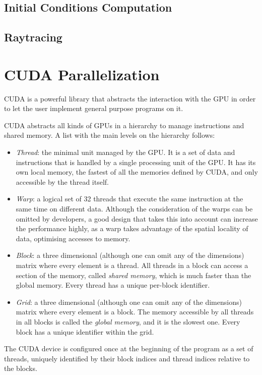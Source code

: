 \subsection{Initial Conditions Computation}
\subsection{Raytracing}

\section{CUDA Parallelization}

\ac{CUDA} is a powerful library that abstracts the interaction with the \ac{GPU} in order to let the user implement general purpose programs on it.

\ac{CUDA} abstracts all kinds of \acp{GPU} in a hierarchy to manage instructions and shared memory. A list with the main levels on the hierarchy follows:
\begin{itemize}
	\item \emph{Thread}: the minimal unit managed by the \ac{GPU}. It is a set of data and instructions that is handled by a single processing unit of the \ac{GPU}. It has its own local memory, the fastest of all the memories defined by \ac{CUDA}, and only accessible by the thread itself.
	\item \emph{Warp}: a logical set of 32 threads that execute the same instruction at the same time on different data. Although the consideration of the warps can be omitted by developers, a good design that takes this into account can increase the performance highly, as a warp takes advantage of the spatial locality of data, optimising accesses to memory.
	\item \emph{Block}: a three dimensional (although one can omit any of the dimensions) matrix where every element is a thread. All threads in a block can access a section of the memory, called \emph{shared memory}, which is much faster than the global memory. Every thread has a unique per-block identifier.
	\item \emph{Grid}: a three dimensional (although one can omit any of the dimensions) matrix where every element is a block. The memory accessible by all threads in all blocks is called the \emph{global memory}, and it is the slowest one. Every block has a unique identifier within the grid.
\end{itemize}

The \ac{CUDA} device is configured once at the beginning of the program as a set of threads, uniquely identified by their block indices and thread indices relative to the blocks.

